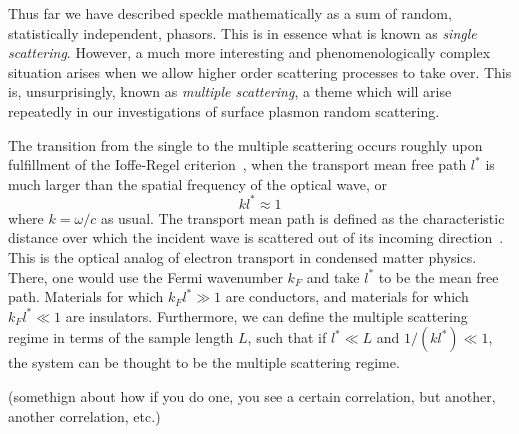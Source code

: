 Thus far we have described speckle mathematically as a sum of random,
statistically independent, phasors.  This is in essence what is known as
\textit{single scattering}.  However, a much more interesting and
phenomenologically complex situation arises when we allow higher order
scattering processes to take over.  This is, unsurprisingly, known as
\textit{multiple scattering}, a theme which will arise repeatedly in our
investigations of surface plasmon random scattering.  

The transition from the single to the multiple scattering occurs roughly upon
fulfillment of the Ioffe-Regel criterion~\cite{offe1960non}, when the
transport mean free path $l^*$ is much larger than the spatial frequency of
the optical wave, or
\begin{equation}
k l^* \approx 1
\end{equation}
where $k=\omega/c$ as usual.  The transport mean path is defined as the
characteristic distance over which the incident wave is scattered out of
its incoming direction~\cite{berkovits1994correlations}.  This is the
optical analog of electron transport in condensed matter physics.  There,
one would use the Fermi wavenumber $k_F$ and take $l^*$ to be the mean free
path.  Materials for which $k_F l^* \gg 1$ are conductors, and materials
for which $k_F l^* \ll 1$ are insulators.  Furthermore, we can define the
multiple scattering regime in terms of the sample length $L$, such that if
$l^* \ll L$ and $1/(k l^*) \ll 1$, the system can be thought to be the
multiple scattering regime.  

(somethign about how if you do one, you see a certain correlation, but
another, another correlation, etc.)
